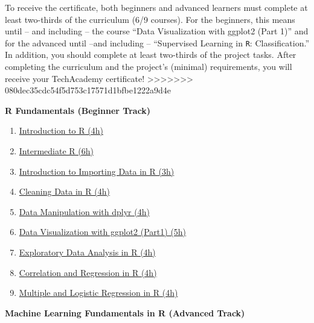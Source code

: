 \documentclass[
  11pt,
]{article}
\providecommand{\tightlist}{%
  \setlength{\itemsep}{0pt}\setlength{\parskip}{0pt}}
\newenvironment{tips}[1]
  {
  \begin{itemize}
  \footnotesize
  \renewcommand{\labelitemi}{
    \raisebox{-.7\height}[0pt][0pt]{
      {\setkeys{Gin}{width=3em,keepaspectratio}
        \texttt{[image: images/\#1.png]}}
    }
  }
  \setlength{\fboxsep}{1em}
  \begin{rbox}
  \item
  }
  {
  \end{rbox}
  \end{itemize}
  }
\begin{document}
To receive the certificate, both beginners and advanced learners must complete at least two-thirds of the curriculum (6/9 courses). For the beginners, this means until -- and including -- the course ``Data Visualization with ggplot2 (Part 1)'' and for the advanced until --and including -- ``Supervised Learning in \texttt{R}: Classification.'' In addition, you should complete at least two-thirds of the project tasks. After completing the curriculum and the project's (minimal) requirements, you will receive your TechAcademy certificate!
>>>>>>> 080dec35cdc54f5d753c17571d1bfbe1222a9d4e

\begin{tips}r

\textbf{R Fundamentals (Beginner Track)}

\begin{enumerate}
\def\labelenumi{\arabic{enumi}.}
\tightlist
\item
  \href{https://www.datacamp.com/courses/free-introduction-to-r}{Introduction to R (4h)}
\item
  \href{https://www.datacamp.com/courses/intermediate-r}{Intermediate R (6h)}
\item
  \href{https://www.datacamp.com/courses/importing-data-in-r-part-1}{Introduction to Importing Data in R (3h)}
\item
  \href{https://www.datacamp.com/courses/cleaning-data-in-r}{Cleaning Data in R (4h)}
\item
  \href{https://www.datacamp.com/courses/data-manipulation-with-dplyr-in-r}{Data Manipulation with dplyr (4h)}
\item
  \href{https://www.datacamp.com/courses/data-visualization-with-ggplot2-1}{Data Visualization with ggplot2 (Part1) (5h)}
\item
  \href{https://www.datacamp.com/courses/exploratory-data-analysis}{Exploratory Data Analysis in R (4h)}
\item
  \href{https://www.datacamp.com/courses/correlation-and-regression}{Correlation and Regression in R (4h)}
\item
  \href{https://www.datacamp.com/courses/multiple-and-logistic-regression}{Multiple and Logistic Regression in R (4h)}
\end{enumerate}

\textbf{Machine Learning Fundamentals in R (Advanced Track)}


\end{tips}
\end{document}
